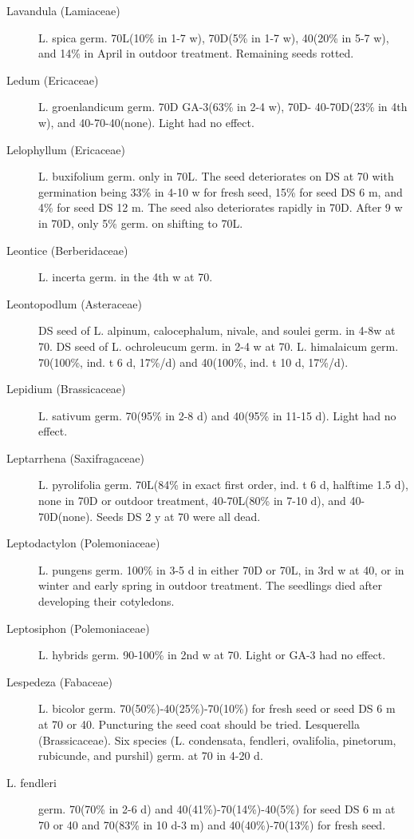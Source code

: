 \begin{description}
\item[Lavandula (Lamiaceae)] L. spica germ. 70L(10\% in 1-7 w), 70D(5\% in 1-7
w), 40(20\% in 5-7 w), and 14\% in April in outdoor treatment. Remaining seeds rotted.
\item[Ledum (Ericaceae)] L. groenlandicum germ. 70D GA-3(63\% in 2-4 w), 70D-
40-70D(23\% in 4th w), and 40-70-40(none). Light had no effect.

\item[Lelophyllum (Ericaceae)] L. buxifolium germ. only in 70L. The seed
deteriorates on DS at 70 with germination being 33\% in 4-10 w for fresh seed, 15\%
for seed DS 6 m, and 4\% for seed DS 12 m. The seed also deteriorates rapidly in 70D.
After 9 w in 70D, only 5\% germ. on shifting to 70L.
\item[Leontice (Berberidaceae)] L. incerta germ. in the 4th w at 70.
\item[Leontopodlum (Asteraceae)] DS seed of L. alpinum, calocephalum, nivale,
and soulei germ. in 4-8w at 70. DS seed of L. ochroleucum germ. in 2-4 w at 70. L.
himalaicum germ. 70(100\%, ind. t 6 d, 17\%/d) and 40(100\%, ind. t 10 d, 17\%/d).
\item[Lepidium (Brassicaceae)] L. sativum germ. 70(95\% in 2-8 d) and 40(95\%
in 11-15 d). Light had no effect.
\item[Leptarrhena (Saxifragaceae)] L. pyrolifolia germ. 70L(84\% in exact first
order, ind. t 6 d, halftime 1.5 d), none in 70D or outdoor treatment, 40-70L(80\% in 7-10
d), and 40-70D(none). Seeds DS 2 y at 70 were all dead.

\item[Leptodactylon (Polemoniaceae)] L. pungens germ. 100\% in 3-5 d in
either 70D or 70L, in 3rd w at 40, or in winter and early spring in outdoor treatment.
The seedlings died after developing their cotyledons.
\item[Leptosiphon (Polemoniaceae)] L. hybrids germ. 90-100\% in 2nd w at 70.
Light or GA-3 had no effect.

\item[Lespedeza (Fabaceae)] L. bicolor germ. 70(50\%)-40(25\%)-70(10\%) for
fresh seed or seed DS 6 m at 70 or 40. Puncturing the seed coat should be tried.
Lesquerella (Brassicaceae). Six species (L. condensata, fendleri,
ovalifolia, pinetorum, rubicunde, and purshil) germ. at 70 in 4-20 d.
\item[L. fendleri] germ. 70(70\% in 2-6 d) and 40(41\%)-70(14\%)-40(5\%) for seed DS 6
m at 70 or 40 and 70(83\% in 10 d-3 m) and 40(40\%)-70(13\%) for fresh seed.


\end{description}
